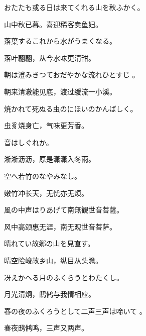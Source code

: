 \begin{haiku}
    {\FH おたたも或る日は来てくれる山を秋ふかく。}

    {\FK 山中秋已暮。喜迎稀客卖鱼妇。}
\end{haiku}

\begin{haiku}
    {\FH 落葉するこれから水がうまくなる。}

    {\FK 落叶翩翩，从今水味更清甜。}
\end{haiku}

\begin{haiku}
    {\FH 朝は澄みきつておだやかな流れひとすじ 。}

    {\FK 朝来清澈能见底，渡过缓流一小溪。}
\end{haiku}

\begin{haiku}
    {\FH 焼かれて死ぬる虫のにほいのかんばしく。}

    {\FK 虫豸烧身亡，气味更芳香。}
\end{haiku}

\begin{haiku}
    {\FH 音はしぐれか。}

    {\FK 淅淅沥沥，原是潇潇入冬雨。}
\end{haiku}

\begin{haiku}
    {\FH 空へ若竹のなやみなし。}

    {\FK 嫩竹冲长天，无忧亦无烦。}
\end{haiku}

\begin{haiku}
    {\FH 風の中声はりあげて南無観世音菩薩。}

    {\FK 风中高颂惠无涯，南无观世音菩萨。}
\end{haiku}

\begin{haiku}
    {\FH 晴れてい故郷の山を見直す。}

    {\FK 晴空险峻故乡山，纵目从头瞻。}
\end{haiku}

\begin{haiku}
    {\FH 冴えかへる月のふくらうとわたくし。}

    {\FK 月光清炯，鸱鸺与我情相应。}
\end{haiku}

\begin{haiku}
    {\FH 春の夜のふくろうとして二声三声は啼いて 。}

    {\FK 春夜鸱鸺鸣，三声又两声。}
\end{haiku}

